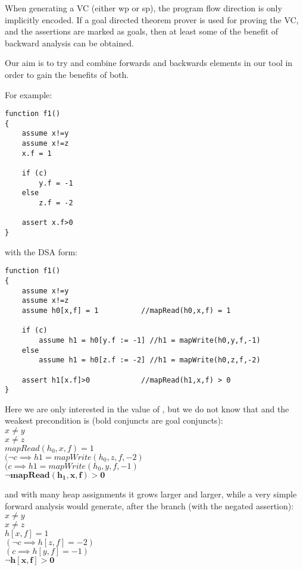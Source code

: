 When generating a VC (either wp or sp), the program flow direction is only implicitly encoded.
If a goal directed theorem prover is used for proving the VC, and the assertions are marked as goals, then at least some of the benefit of backward analysis can be obtained.

Our aim is to try and combine forwards and backwards elements in our tool in order to gain the benefits of both.

For example:
\begin{lstlisting}
function f1()
{
	assume x!=y
	assume x!=z
	x.f = 1
	
	if (c)
		y.f = -1
	else
		z.f = -2
		
	assert x.f>0
}
\end{lstlisting}		

with the DSA form:

\begin{lstlisting}
function f1()
{
	assume x!=y
	assume x!=z
	assume h0[x,f] = 1          //mapRead(h0,x,f) = 1
	
	if (c)
		assume h1 = h0[y.f := -1] //h1 = mapWrite(h0,y,f,-1)
	else
		assume h1 = h0[z.f := -2] //h1 = mapWrite(h0,z,f,-2)
		
	assert h1[x.f]>0            //mapRead(h1,x,f) > 0
}
\end{lstlisting}		

Here we are only interested in the value of , but we do not know that  and the weakest precondition is (bold conjuncts are goal conjuncts): \\
	$x \neq y$ \\
	$x \neq z$ \\
	$mapRead(h_0,x,f) = 1 $ \\
	$(\lnot c \implies h1 = mapWrite(h_0,z,f,-2) $ \\
	$(      c \implies h1 = mapWrite(h_0,y,f,-1) $ \\
	$\mathbf{\lnot mapRead(h_1,x,f) > 0} $

and with many heap assignments it grows larger and larger, while a very simple forward analysis would generate, after the branch (with the negated assertion):\\
	$x \neq y $ \\
	$x \neq z $ \\
	$h[x,f] = 1 $ \\
	$(\lnot c \implies h[z,f]=-2)$ \\
	$(      c \implies h[y,f]=-1)$ \\
	$\mathbf{\lnot h[x,f] > 0}$

